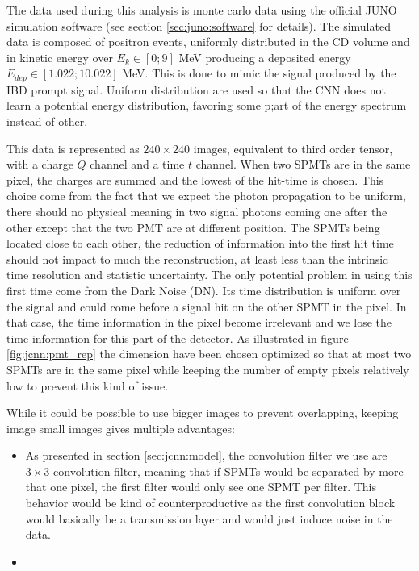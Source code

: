The data used during this analysis is monte carlo data using the official JUNO simulation software (see section \ref{sec:juno:software} for details). The simulated data is composed of positron events, uniformly distributed in the CD volume and in kinetic energy over $E_k \in [0; 9]$ MeV producing a deposited energy $E_{dep} \in [1.022; 10.022]$ MeV. This is done to mimic the signal produced by the IBD prompt signal. Uniform distribution are used so that the CNN does not learn a potential energy distribution, favoring some p;art of the energy spectrum instead of other.

This data is represented as $240 \times 240$ images, equivalent to third order tensor, with a charge $Q$ channel and a time $t$ channel. When two SPMTs are in the same pixel, the charges are summed and the lowest of the hit-time is chosen. This choice come from the fact that we expect the photon propagation to be uniform, there should no physical meaning in two signal photons coming one after the other except that the two PMT are at different position. The SPMTs being located close to each other, the reduction of information into the first hit time should not impact to much the reconstruction, at least less than the intrinsic time resolution and statistic uncertainty. The only potential problem in using this first time come from the Dark Noise (DN). Its time distribution is uniform over the signal and could come before a signal hit on the other SPMT in the pixel. In that case, the time information in the pixel become irrelevant and we lose the time information for this part of the detector.
As illustrated in figure \ref{fig:jcnn:pmt_rep} the dimension have been chosen optimized so that at most two SPMTs are in the same pixel while keeping the number of empty pixels relatively low to prevent this kind of issue.

While it could be possible to use bigger images to prevent overlapping, keeping image small images gives multiple advantages:
\begin{itemize}
  \item As presented in section \ref{sec:jcnn:model}, the convolution filter we use are $3 \times 3$ convolution filter, meaning that if SPMTs would be separated by more that one pixel, the first filter would only see one SPMT per filter. This behavior would be kind of counterproductive as the first convolution block would basically be a transmission layer and would just induce noise in the data.
  \item 
\end{itemize}

